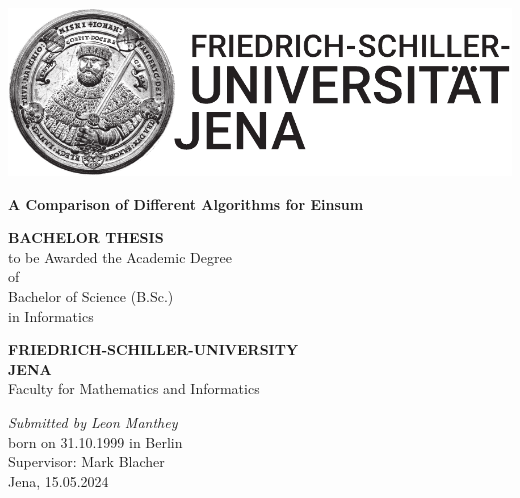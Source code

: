 \documentclass[12pt]{report}
\begin{document}
\begin{titlepage}
    \begin{center}

        \begin{spacing}{1.5}
            \includegraphics[scale=0.9]{Bildmarke_black_15cm-eps-converted-to.pdf}
            \vspace*{\fill}
        \end{spacing}
        \begin{spacing}{2.5}
            \textbf{\huge A Comparison of Different Algorithms for Einsum}\\[0.5cm]
            \vspace*{\fill}
            \begin{spacing}{1.5}
                \textbf{BACHELOR THESIS\\}
                to be Awarded the Academic Degree\\
                of\\
                Bachelor of Science (B.Sc.)\\
                in Informatics\\
            \end{spacing}
        \end{spacing}

        \vspace*{\fill}

        \begin{spacing}{1.15}
            \textbf{FRIEDRICH-SCHILLER-UNIVERSITY\\JENA\\}
            Faculty for Mathematics and Informatics

            \vspace*{\fill}

            \textit{Submitted by Leon Manthey}\\
            born on 31.10.1999 in Berlin\\
            Supervisor: Mark Blacher\\
            Jena, 15.05.2024

        \end{spacing}
    \end{center}
\end{titlepage}
\end{document}
